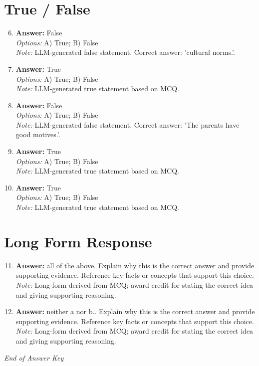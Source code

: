 \documentclass[12pt]{article}
\begin{document}
\section*{True / False}
\begin{enumerate}[label=\arabic*.]
\setcounter{enumi}{5}
\item \textbf{Answer:} False
\\ \textit{Options:} A) True; B) False
\\ \textit{Note:} LLM-generated false statement. Correct answer: 'cultural norms.'.
\item \textbf{Answer:} True
\\ \textit{Options:} A) True; B) False
\\ \textit{Note:} LLM-generated true statement based on MCQ.
\item \textbf{Answer:} False
\\ \textit{Options:} A) True; B) False
\\ \textit{Note:} LLM-generated false statement. Correct answer: 'The parents have good motives.'.
\item \textbf{Answer:} True
\\ \textit{Options:} A) True; B) False
\\ \textit{Note:} LLM-generated true statement based on MCQ.
\item \textbf{Answer:} True
\\ \textit{Options:} A) True; B) False
\\ \textit{Note:} LLM-generated true statement based on MCQ.
\end{enumerate}

\section*{Long Form Response}
\begin{enumerate}[label=\arabic*.]
\setcounter{enumi}{10}
\item \textbf{Answer:} all of the above. Explain why this is the correct answer and provide supporting evidence. Reference key facts or concepts that support this choice.
\\ \textit{Note:} Long-form derived from MCQ; award credit for stating the correct idea and giving supporting reasoning.
\item \textbf{Answer:} neither a nor b.. Explain why this is the correct answer and provide supporting evidence. Reference key facts or concepts that support this choice.
\\ \textit{Note:} Long-form derived from MCQ; award credit for stating the correct idea and giving supporting reasoning.
\end{enumerate}

\vfill
\noindent\textit{End of Answer Key}
\end{document}
